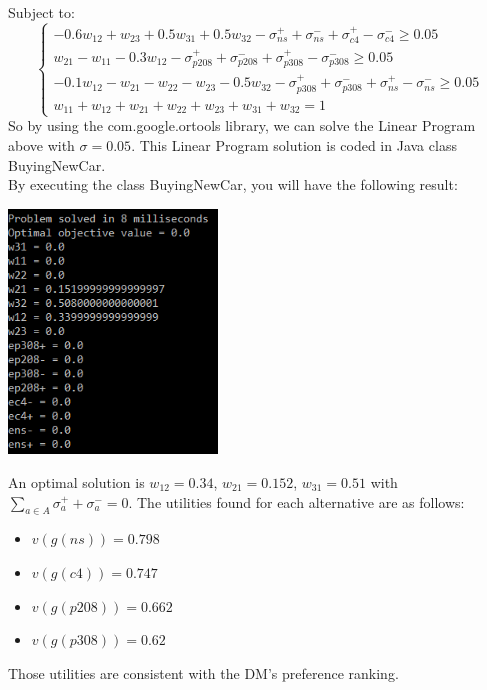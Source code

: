 \documentclass{article}
\begin{document}
Subject to: \\
\begin{equation}
	\begin{cases}
		 -0.6w_{12} + w_{23} + 0.5w_{31} + 0.5w_{32}  -\sigma _{ns}^{+} +\sigma _{ns}^{-} +\sigma _{c4}^{+} - \sigma _{c4}^{-}   \geq 0.05\\
		w_{21} - w_{11} - 0.3w_{12} -\sigma _{p208}^{+} +\sigma _{p208}^{-} +\sigma _{p308}^{+} - \sigma _{p308}^{-}  \geq 0.05 \\
		- 0.1w_{12} - w_{21} - w_{22} - w_{23} - 0.5w_{32} -\sigma _{p308}^{+} +\sigma _{p308}^{-} +\sigma _{ns}^{+} - \sigma _{ns}^{-}  \geq 0.05 \\
		w_{11} + w_{12} + w_{21} + w_{22} + w_{23} + w_{31} + w_{32} = 1
	\end{cases}
\end{equation}
So by using the com.google.ortools library, we can solve the Linear Program above with $\sigma = 0.05$. This Linear Program solution is coded in Java class BuyingNewCar.\\
By executing the class BuyingNewCar, you will have the following result: \\
\begin{center}
\includegraphics[height=6.5cm]{result.png}
\end{center}
An optimal solution is $w_{12} = 0.34$, $w_{21} = 0.152$, $w_{31} = 0.51$ with $\sum_{a \in A} \sigma _{a}^{+} + \sigma _{a}^{-} = 0$. The utilities found for each alternative are as follows: \\ 
\begin{itemize}
\item $v(g(ns)) = 0.798$
\item $v(g(c4)) = 0.747$
\item $v(g(p208)) = 0.662 $
\item $v(g(p308)) = 0.62 $
\end{itemize}
Those utilities are consistent with the DM's preference ranking. \\
\end{document}
